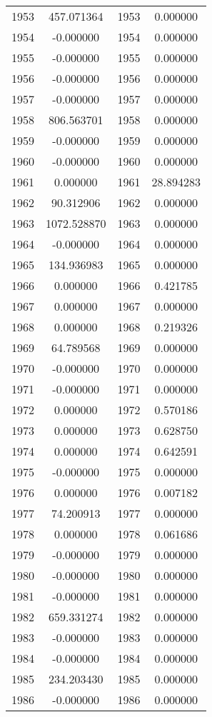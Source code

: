 \documentclass[12pt]{article}
\begin{document}
\begin{longtable}{@{}cccc@{}}
1953 & 457.071364 & 1953 & 0.000000 \\
1954 & -0.000000 & 1954 & 0.000000 \\
1955 & -0.000000 & 1955 & 0.000000 \\
1956 & -0.000000 & 1956 & 0.000000 \\
1957 & -0.000000 & 1957 & 0.000000 \\
1958 & 806.563701 & 1958 & 0.000000 \\
1959 & -0.000000 & 1959 & 0.000000 \\
1960 & -0.000000 & 1960 & 0.000000 \\
1961 & 0.000000 & 1961 & 28.894283 \\
1962 & 90.312906 & 1962 & 0.000000 \\
1963 & 1072.528870 & 1963 & 0.000000 \\
1964 & -0.000000 & 1964 & 0.000000 \\
1965 & 134.936983 & 1965 & 0.000000 \\
1966 & 0.000000 & 1966 & 0.421785 \\
1967 & 0.000000 & 1967 & 0.000000 \\
1968 & 0.000000 & 1968 & 0.219326 \\
1969 & 64.789568 & 1969 & 0.000000 \\
1970 & -0.000000 & 1970 & 0.000000 \\
1971 & -0.000000 & 1971 & 0.000000 \\
1972 & 0.000000 & 1972 & 0.570186 \\
1973 & 0.000000 & 1973 & 0.628750 \\
1974 & 0.000000 & 1974 & 0.642591 \\
1975 & -0.000000 & 1975 & 0.000000 \\
1976 & 0.000000 & 1976 & 0.007182 \\
1977 & 74.200913 & 1977 & 0.000000 \\
1978 & 0.000000 & 1978 & 0.061686 \\
1979 & -0.000000 & 1979 & 0.000000 \\
1980 & -0.000000 & 1980 & 0.000000 \\
1981 & -0.000000 & 1981 & 0.000000 \\
1982 & 659.331274 & 1982 & 0.000000 \\
1983 & -0.000000 & 1983 & 0.000000 \\
1984 & -0.000000 & 1984 & 0.000000 \\
1985 & 234.203430 & 1985 & 0.000000 \\
1986 & -0.000000 & 1986 & 0.000000 \\

\end{longtable}
\end{document}
